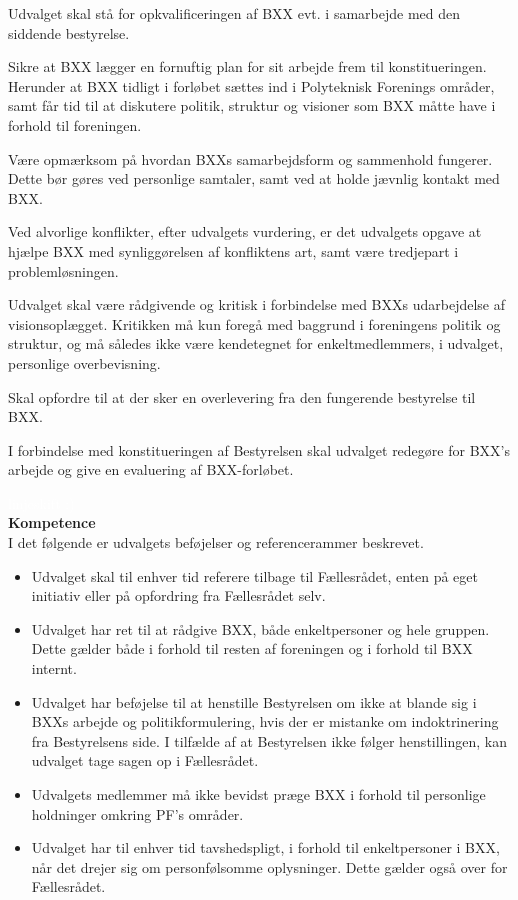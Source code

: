 \begin{list}{•}
\item Udvalget skal stå for opkvalificeringen af BXX evt. i samarbejde med den siddende bestyrelse.
\item Sikre at BXX lægger en fornuftig plan for sit arbejde frem til konstitueringen. Herunder at BXX tidligt i forløbet sættes ind i Polyteknisk Forenings områder, samt får tid til at diskutere politik, struktur og visioner som BXX måtte have i forhold til foreningen.
\item Være opmærksom på hvordan BXXs samarbejdsform og sammenhold fungerer. Dette bør gøres ved personlige
        samtaler, samt ved at holde jævnlig kontakt med BXX.
\item Ved alvorlige konflikter, efter udvalgets vurdering, er det udvalgets opgave at hjælpe BXX med synliggørelsen
     af konfliktens art, samt være tredjepart i problemløsningen.
\item Udvalget skal være rådgivende og kritisk i forbindelse med BXXs udarbejdelse af visionsoplægget. Kritikken
      må kun foregå med baggrund i foreningens politik og struktur, og må således ikke være kendetegnet for
          enkeltmedlemmers, i udvalget, personlige overbevisning.
\item Skal opfordre til at der sker en overlevering fra den fungerende bestyrelse til BXX.
\item I forbindelse med konstitueringen af Bestyrelsen skal udvalget redegøre for BXX’s arbejde og give en
      evaluering af BXX-forløbet.
\end{list}
\textcolor{white}{linjeskift :)}\\
\textbf{Kompetence}\\
I det følgende er udvalgets beføjelser og referencerammer beskrevet.
\begin{itemize}
\item Udvalget skal til enhver tid referere tilbage til Fællesrådet, enten på eget initiativ eller på opfordring fra Fællesrådet
         selv.
\item Udvalget har ret til at rådgive BXX, både enkeltpersoner og hele gruppen. Dette gælder både i forhold til resten af
       foreningen og i forhold til BXX internt.
\item Udvalget har beføjelse til at henstille Bestyrelsen om ikke at blande sig i BXXs arbejde og politikformulering, hvis
    der er mistanke om indoktrinering fra Bestyrelsens side. I tilfælde af at Bestyrelsen ikke følger henstillingen, kan
     udvalget tage sagen op i Fællesrådet.
\item Udvalgets medlemmer må ikke bevidst præge BXX i forhold til personlige holdninger omkring PF's områder.
\item      Udvalget har til enhver tid tavshedspligt, i forhold til enkeltpersoner i BXX, når det drejer sig om personfølsomme
     oplysninger. Dette gælder også over for Fællesrådet.
\end{itemize}


